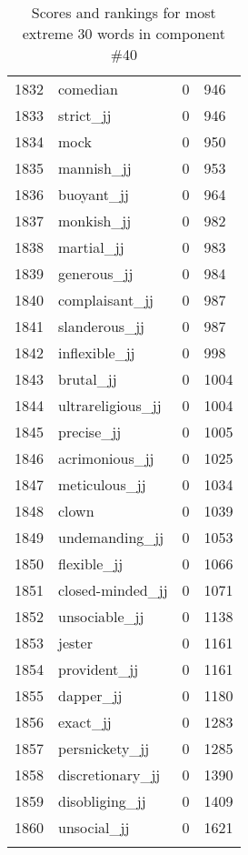 \begin{longtable}[!htbp]{| rlr@{.}l |}
    1832 & comedian & 0 & 946 \\
    1833 & strict\_jj & 0 & 946 \\
    1834 & mock & 0 & 950 \\
    1835 & mannish\_jj & 0 & 953 \\
    1836 & buoyant\_jj & 0 & 964 \\
    1837 & monkish\_jj & 0 & 982 \\
    1838 & martial\_jj & 0 & 983 \\
    1839 & generous\_jj & 0 & 984 \\
    1840 & complaisant\_jj & 0 & 987 \\
    1841 & slanderous\_jj & 0 & 987 \\
    1842 & inflexible\_jj & 0 & 998 \\
    1843 & brutal\_jj & 0 & 1004 \\
    1844 & ultrareligious\_jj & 0 & 1004 \\
    1845 & precise\_jj & 0 & 1005 \\
    1846 & acrimonious\_jj & 0 & 1025 \\
    1847 & meticulous\_jj & 0 & 1034 \\
    1848 & clown & 0 & 1039 \\
    1849 & undemanding\_jj & 0 & 1053 \\
    1850 & flexible\_jj & 0 & 1066 \\
    1851 & closed-minded\_jj & 0 & 1071 \\
    1852 & unsociable\_jj & 0 & 1138 \\
    1853 & jester & 0 & 1161 \\
    1854 & provident\_jj & 0 & 1161 \\
    1855 & dapper\_jj & 0 & 1180 \\
    1856 & exact\_jj & 0 & 1283 \\
    1857 & persnickety\_jj & 0 & 1285 \\
    1858 & discretionary\_jj & 0 & 1390 \\
    1859 & disobliging\_jj & 0 & 1409 \\
    1860 & unsocial\_jj & 0 & 1621 \\
    \hline
    \caption{Scores and rankings for most extreme 30 words in component \#40} \\
\end{longtable}
